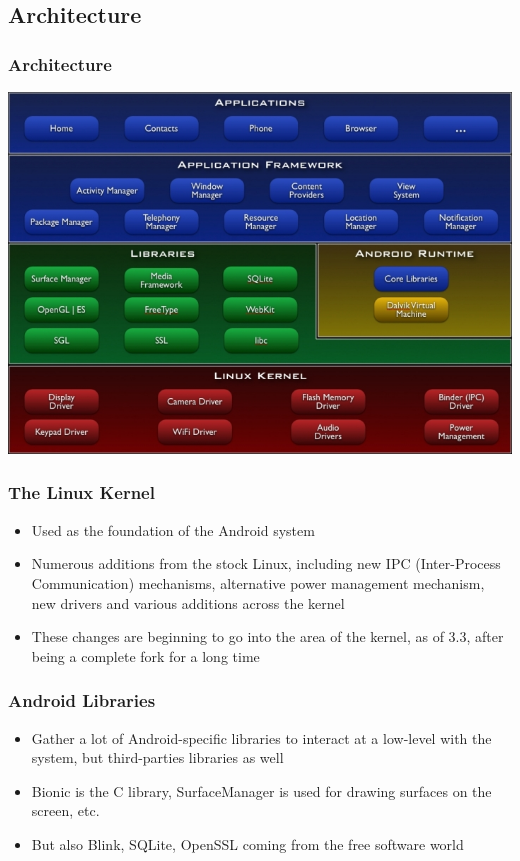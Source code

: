 \subsection{Architecture}
\begin{frame}
  \frametitle{Architecture}
  \begin{center}
    \includegraphics[width=\textwidth]{slides/android-introduction-architecture/architecture.jpg}
  \end{center}
\end{frame}

\begin{frame}
  \frametitle{The Linux Kernel}
  \begin{itemize}
  \item Used as the foundation of the Android system
  \item Numerous additions from the stock Linux, including new IPC (Inter-Process Communication) mechanisms,
    alternative power management mechanism, new drivers and various
    additions across the kernel
  \item These changes are beginning to go into the 
    area of the kernel, as of 3.3, after being a complete fork for a
    long time
  \end{itemize}
\end{frame}

\begin{frame}
  \frametitle{Android Libraries}
  \begin{itemize}
  \item Gather a lot of Android-specific libraries to interact at a
    low-level with the system, but third-parties libraries as well
  \item Bionic is the C library, SurfaceManager is used for drawing
    surfaces on the screen, etc.
  \item But also Blink, SQLite, OpenSSL coming from the free software
    world
  \end{itemize}
\end{frame}

